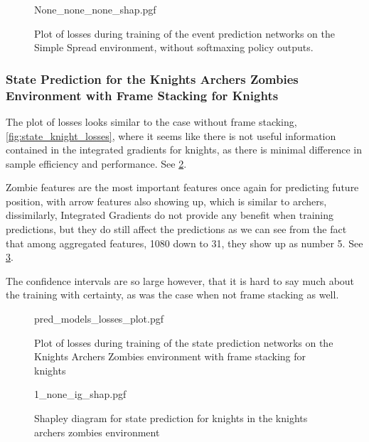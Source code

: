 \documentclass[UKenglish]{uiomasterthesis}
\begin{document}
\begin{figure}[hbtp]
    \centering
    {None_none_none_shap.pgf}
    \caption{Plot of losses during training of the event prediction networks on the Simple Spread environment, without softmaxing policy outputs.}
    \label{fig:crit_kaz_archer_stack}
\end{figure}

\subsubsection{State Prediction for the Knights Archers Zombies Environment with Frame Stacking for Knights}

The plot of losses looks similar to the case without frame stacking, \cref{fig:state_knight_losses}, where it seems like there is not useful information contained in the integrated gradients for knights, as there is minimal difference in sample efficiency and performance. See \cref{fig:pred_losses_kaz_knight_stack}.

Zombie features are the most important features once again for predicting future position, with arrow features also showing up, which is similar to archers, dissimilarly, Integrated Gradients do not provide any benefit when training predictions, but they do still affect the predictions as we can see from the fact that among aggregated features, 1080 down to 31, they show up as number 5. See \cref{fig:pred_kaz_knight_stack}.

The confidence intervals are so large however, that it is hard to say much about the training with certainty, as was the case when not frame stacking as well.

\begin{figure}[hbtp]
    \centering
    {pred_models_losses_plot.pgf}
    \caption{Plot of losses during training of the state prediction networks on the Knights Archers Zombies environment with frame stacking for knights}
	\label{fig:pred_losses_kaz_knight_stack}
\end{figure}

\begin{figure}[hbtp]
    \centering
    {1_none_ig_shap.pgf}
    \caption{Shapley diagram for state prediction for knights in the knights archers zombies environment}
    \label{fig:pred_kaz_knight_stack}
\end{figure}
\end{document}
